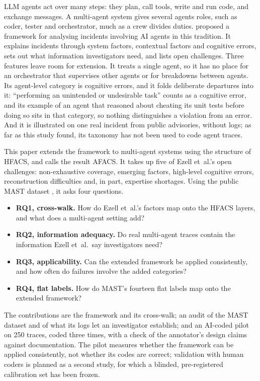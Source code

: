 \documentclass[10pt]{article}
\begin{document}
LLM agents act over many steps: they plan, call tools, write and run code, and
exchange messages. A multi-agent system gives several agents roles, such as coder,
tester and orchestrator, much as a crew divides duties. \citet{ezell2025incident} proposed a framework for analysing incidents
involving AI agents in this tradition. It explains incidents through system
factors, contextual factors and cognitive errors, sets out what information
investigators need, and lists open challenges. Three features leave room for
extension. It treats a single agent, so it has no place for an orchestrator that
supervises other agents or for breakdowns between agents. Its agent-level category
is cognitive errors, and it folds deliberate departures into it: ``performing an
unintended or undesirable task'' counts as a cognitive error, and its example of an
agent that reasoned about cheating its unit tests before doing
so \citep{baker2025monitoring} sits in that category, so nothing distinguishes a
violation from an error. And it is illustrated on one real incident from public
advisories, without logs; as far as this study found, its taxonomy has not been
used to code agent traces.

This paper extends the framework to multi-agent systems using the structure of
HFACS, and calls the result AFACS. It takes up five of Ezell et~al.'s open
challenges: non-exhaustive coverage, emerging factors, high-level cognitive
errors, reconstruction difficulties and, in part, expertise shortages. Using the public MAST dataset \citep{cemri2025mast}, it asks
four questions.
\begin{itemize}\setlength{\itemsep}{1pt}
  \item \textbf{RQ1, cross-walk.} How do Ezell et~al.'s factors map onto the
  HFACS layers, and what does a multi-agent setting add?
  \item \textbf{RQ2, information adequacy.} Do real multi-agent traces contain the
  information Ezell et~al.\ say investigators need?
  \item \textbf{RQ3, applicability.} Can the extended framework be applied
  consistently, and how often do failures involve the added categories?
  \item \textbf{RQ4, flat labels.} How do MAST's fourteen flat labels map onto the
  extended framework?
\end{itemize}
The contributions are the framework and its cross-walk; an audit of the MAST
dataset and of what its logs let an investigator establish; and an AI-coded pilot
on 250 traces, coded three times, with a check of the annotator's design claims
against documentation. The pilot measures whether the framework can be applied
consistently, not whether its codes are correct; validation with human coders is
planned as a second study, for which a blinded, pre-registered calibration set has
been frozen.
\end{document}

